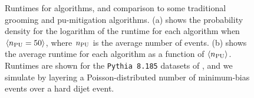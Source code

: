\begin{subappendices}
\begin{figure}[t!]
    \caption[
    Runtimes for \PIRANHA{} algorithms, and comparison to some traditional grooming and \gls{pu-mitigation} algorithms.]{
    Runtimes for \PIRANHA{} algorithms, and comparison to some traditional grooming and \gls{pu-mitigation} algorithms.
    (a) shows the probability density for the logarithm of the runtime for each algorithm when \(\langle n_{\rm PU} = 50\rangle\), where \(n_{\rm PU}\) is the average number of  events.
    (b) shows the average runtime for each algorithm as a function of \(\langle n_{\rm PU} \rangle\).
    Runtimes are shown for the \texttt{Pythia 8.185} datasets of , and we simulate  by layering a Poisson-distributed number of minimum-bias events over a hard dijet event.
    }
    \label{fig:runtimes}
\end{figure}



\end{subappendices}
